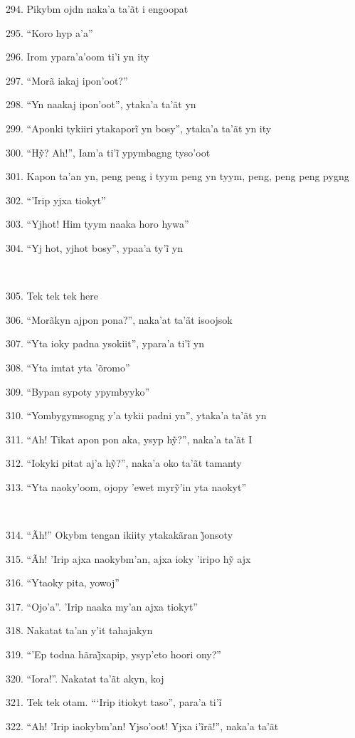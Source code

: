 294. Pikybm ojdn naka'a ta'ãt i engoopat

295. ``Koro hyp a'a''

296. Irom ypara'a'oom ti'i yn ity

297. ``Morã iakaj ipon'oot?''

298. ``Yn naakaj ipon'oot'', ytaka'a ta'ãt yn

299. ``Aponki tykiiri ytakaporĩ yn bosy'', ytaka’a ta’ãt yn ity

300. ``Hỹ? Ah!'', Iam’a ti’ĩ ypymbagng tyso’oot

301. Kapon ta'an yn, peng peng i tyym peng yn tyym, peng, peng peng pygng

302. ``'Irip yjxa tiokyt''

303. ``Yjhot! Him tyym naaka horo hywa''

304. ``Yj hot, yjhot bosy'', ypaa’a ty’ĩ yn

~

305. Tek tek tek here

306. ``Morãkyn ajpon pona?'', naka'at ta'ãt isoojsok

307. ``Yta ioky padna ysokiit'', ypara’a ti’ĩ yn

308. ``Yta imtat yta 'õromo''

309. ``Bypan sypoty ypymbyyko''

310. ``Yombygymsogng y'a tykii padni yn'', ytaka'a ta'ãt yn

311. ``Ah! Tikat apon pon aka, ysyp hỹ?'', naka’a ta’ãt I

312. ``Iokyki pitat aj’a hỹ?'', naka’a oko ta’ãt tamanty

313. ``Yta naoky’oom, ojopy ’ewet myrỹ’in yta naokyt''

~

314. ``Ãh!'' Okybm tengan ikiity ytakakãran j̃onsoty

315. ``Ãh! ’Irip ajxa naokybm’an, ajxa ioky ’iripo hỹ ajx

316. ``Ytaoky pita, yowoj''

317. ``Ojo'a''. 'Irip naaka my'an ajxa tiokyt''

318. Nakatat ta'an y'it tahajakyn

319. ``’Ep todna hãraj̃xapip, ysyp’eto hoori ony?''

320. ``Iora!''. Nakatat ta'ãt akyn, koj

321. Tek tek otam. ``‘Irip itiokyt taso'', para’a ti’ĩ

322. ``Ah! ’Irip iaokybm’an! Yjso’oot! Yjxa i’ĩrã!'', naka’a ta’ãt

